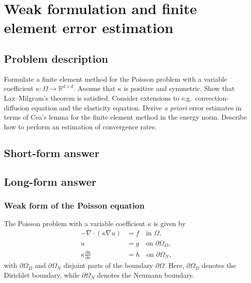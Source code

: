 \section{Weak formulation and finite element error estimation}
\subsection*{Problem description}
Formulate a finite element method for the Poisson problem with a variable coefficient $\kappa : \Omega \to \mathbb{R}^{d \times d}$.
Assume that $\kappa$ is positive and symmetric.
Show that Lax--Milgram's theorem is satisfied. %
Consider extensions to e.g.\ convection-diffusion equation and the elasticity equation.
Derive \textit{a priori} error estimates in terms of Cea's lemma for the finite element method in the energy norm.
Describe how to perform an estimation of convergence rates.

\subsection{Short-form answer}


\subsection{Long-form answer}

\subsubsection{Weak form of the Poisson equation}
The Poisson problem with a variable coefficient $\kappa$ is given by
\begin{equation}
    \begin{split}
        -\nabla \cdot (\kappa \nabla u) &= f \quad \text{in } \Omega, \\
        u &= g \quad \text{on } \partial\Omega_D, \\
        \kappa \frac{\partial u}{\partial n} &= h \quad \text{on } \partial\Omega_N,
    \end{split}
\end{equation}
with $\partial\Omega_D$ and $\partial\Omega_N$ disjoint parts of the boundary $\partial\Omega$.
Here, $\partial\Omega_D$ denotes the Dirichlet boundary, while $\partial\Omega_N$ denotes the Neumann boundary.

